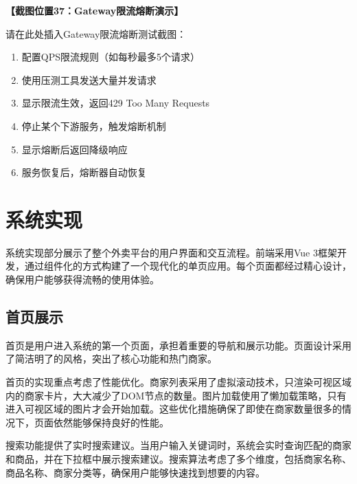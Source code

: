 \documentclass[a4paper,12pt]{article}
\begin{document}
\textbf{【截图位置37：Gateway限流熔断演示】}

请在此处插入Gateway限流熔断测试截图：
\begin{enumerate}
\item 配置QPS限流规则（如每秒最多5个请求）
\item 使用压测工具发送大量并发请求
\item 显示限流生效，返回429 Too Many Requests
\item 停止某个下游服务，触发熔断机制
\item 显示熔断后返回降级响应
\item 服务恢复后，熔断器自动恢复
\end{enumerate}

\section{系统实现}

系统实现部分展示了整个外卖平台的用户界面和交互流程。前端采用Vue 3框架开发，通过组件化的方式构建了一个现代化的单页应用。每个页面都经过精心设计，确保用户能够获得流畅的使用体验。

\subsection{首页展示}

首页是用户进入系统的第一个页面，承担着重要的导航和展示功能。页面设计采用了简洁明了的风格，突出了核心功能和热门商家。

\begin{center}
\end{center}

首页的实现重点考虑了性能优化。商家列表采用了虚拟滚动技术，只渲染可视区域内的商家卡片，大大减少了DOM节点的数量。图片加载使用了懒加载策略，只有进入可视区域的图片才会开始加载。这些优化措施确保了即使在商家数量很多的情况下，页面依然能够保持良好的性能。

搜索功能提供了实时搜索建议。当用户输入关键词时，系统会实时查询匹配的商家和商品，并在下拉框中展示搜索建议。搜索算法考虑了多个维度，包括商家名称、商品名称、商家分类等，确保用户能够快速找到想要的内容。
\end{document}
